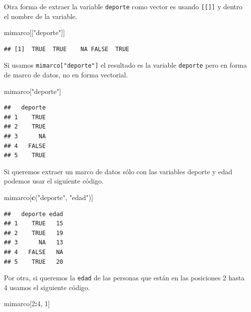 \documentclass[10pt,]{krantz}
\makeatletter
\newenvironment{Shaded}{\begin{snugshade}}{\end{snugshade}}
\newcommand{\KeywordTok}[1]{\textcolor[rgb]{0.13,0.29,0.53}{\textbf{#1}}}
\newcommand{\DecValTok}[1]{\textcolor[rgb]{0.00,0.00,0.81}{#1}}
\newcommand{\StringTok}[1]{\textcolor[rgb]{0.31,0.60,0.02}{#1}}
\newcommand{\OperatorTok}[1]{\textcolor[rgb]{0.81,0.36,0.00}{\textbf{#1}}}
\newcommand{\NormalTok}[1]{#1}
\newenvironment{kframe}{%
\medskip{}
\setlength{\fboxsep}{.8em}
 \def\at@end@of@kframe{}%
 \ifinner\ifhmode%
  \def\at@end@of@kframe{\end{minipage}}%
  \begin{minipage}{\columnwidth}%
 \fi\fi%
 \def\FrameCommand##1{\hskip\@totalleftmargin \hskip-\fboxsep
 \colorbox{shadecolor}{##1}\hskip-\fboxsep
     \hskip-\linewidth \hskip-\@totalleftmargin \hskip\columnwidth}%
 \MakeFramed {\advance\hsize-\width
   \@totalleftmargin\z@ \linewidth\hsize
   \@setminipage}}%
 {\par\unskip\endMakeFramed%
 \at@end@of@kframe}
\renewenvironment{Shaded}{\begin{kframe}}{\end{kframe}}
\makeatother
\begin{document}
Otra forma de extraer la variable \texttt{deporte} como vector es usando
\texttt{{[}{[}{]}{]}} y dentro el nombre de la variable.

\begin{Shaded}
\begin{Highlighting}[]
\NormalTok{mimarco[[}\StringTok{"deporte"}\NormalTok{]]}
\end{Highlighting}
\end{Shaded}

\begin{verbatim}
## [1]  TRUE  TRUE    NA FALSE  TRUE
\end{verbatim}

Si usamos \texttt{mimarco{[}"deporte"{]}} el resultado es la variable
\texttt{deporte} pero en forma de marco de datos, no en forma vectorial.

\begin{Shaded}
\begin{Highlighting}[]
\NormalTok{mimarco[}\StringTok{"deporte"}\NormalTok{]}
\end{Highlighting}
\end{Shaded}

\begin{verbatim}
##   deporte
## 1    TRUE
## 2    TRUE
## 3      NA
## 4   FALSE
## 5    TRUE
\end{verbatim}

Si queremos extraer un marco de datos sólo con las variables deporte y
edad podemos usar el siguiente código.

\begin{Shaded}
\begin{Highlighting}[]
\NormalTok{mimarco[}\KeywordTok{c}\NormalTok{(}\StringTok{"deporte"}\NormalTok{, }\StringTok{"edad"}\NormalTok{)]}
\end{Highlighting}
\end{Shaded}

\begin{verbatim}
##   deporte edad
## 1    TRUE   15
## 2    TRUE   19
## 3      NA   13
## 4   FALSE   NA
## 5    TRUE   20
\end{verbatim}

Por otra, si queremos la \texttt{edad} de las personas que están en las
posiciones 2 hasta 4 usamos el siguiente código.

\begin{Shaded}
\begin{Highlighting}[]
\NormalTok{mimarco[}\DecValTok{2}\OperatorTok{:}\DecValTok{4}\NormalTok{, }\DecValTok{1}\NormalTok{]}
\end{Highlighting}
\end{Shaded}
\end{document}
